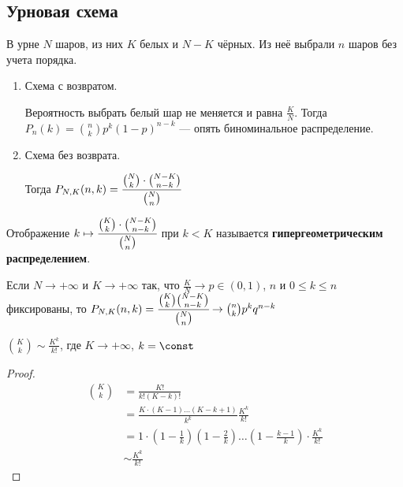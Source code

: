 \subsection{Урновая схема}

В урне \(N\) шаров, из них \(K\) белых и \(N - K\) чёрных. Из неё выбрали \(n\) шаров без учета порядка.

\begin{enumerate}
    \item Схема с возвратом.

          Вероятность выбрать белый шар не меняется и равна \(\frac{K}{N}\). Тогда \(P_n(k) = \binom{n}{k}p^k(1 - p)^{n - k}\) --- опять биноминальное распределение.

    \item Схема без возврата.

          Тогда \(P_{N,K}(n, k) = \cfrac{\binom{N}{k} \cdot \binom{N - K}{n - k}}{\binom{N}{n}} \)
\end{enumerate}

\begin{definition}
    Отображение \(k \mapsto \cfrac{\binom{K}{k}\cdot \binom{N - K}{n - k}}{\binom{N}{n}}\) при \(k < K\) называется \textbf{гипергеометрическим распределением}.
\end{definition}

\begin{theorem}
    Если \(N \to +\infty\) и \(K \to +\infty\) так, что \(\frac{K}{N} \to p\in(0,1)\), \(n\) и \(0 \leq k \leq n\) фиксированы, то \(P_{N,K}(n,k) = \cfrac{\binom{K}{k}\binom{N - K}{n - k}}{\binom{N}{n}} \to \binom{n}{k}p^k q^{n - k}\)

    \label{урна бином}
\end{theorem}

\begin{lemma}
    \(\binom{K}{k} \sim \frac{K^k}{k!} \), где \(K \to +\infty\), \(k = \const\)
\end{lemma}
\begin{proof}
    \begin{align*}
        \binom{K}{k} & = \frac{K!}{k!(K - k)!}                                                                                                             \\
                     & = \frac{K\cdot(K - 1)\dots (K - k + 1)}{k^k}\frac{K^k}{k!}                                                                          \\
                     & = 1\cdot \left( 1 - \frac{1}{k} \right)\left( 1 - \frac{2}{k} \right) \dots \left( 1 - \frac{k - 1}{k} \right) \cdot \frac{K^k}{k!} \\
                     & \sim \frac{K^k}{k!}
    \end{align*}
\end{proof}

